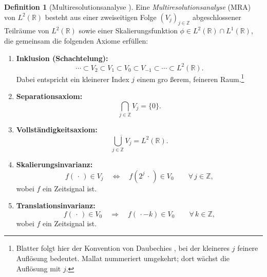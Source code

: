 \documentclass[a4paper,11pt,bibliography=totoc,listof=totoc,headinclude=true,cleardoublepage=empty,oneside]{scrbook}
\theoremstyle{definition}
\newtheorem{definition}[theorem]{Definition}
\theoremstyle{remark}
\begin{document}
   \begin{definition}[Multiresolutionsanalyse {\cite[S.\,106]{blatterWaveletsEinfuhrung2003}}]
   \label{def:mra}
   Eine \emph{Multiresolutionsanalyse} (MRA) von $L^2(\mathbb{R})$ besteht
   aus einer zweiseitigen Folge $(V_j)_{j \in \mathbb{Z}}$ abgeschlossener
   Teilräume von $L^2(\mathbb{R})$ sowie einer Skalierungsfunktion $\phi \in L^2(\mathbb{R}) \cap L^1(\mathbb{R})$,
   die gemeinsam die folgenden Axiome erfüllen:
   
   \begin{enumerate}
     \item \textbf{Inklusion (Schachtelung):}
       \begin{equation}
         \label{eq:mra-inklusion}
         \cdots \subset V_2 \subset V_1 \subset V_0 \subset V_{-1}
                \subset \cdots \subset L^2(\mathbb{R}).
       \end{equation}
       Dabei entspricht ein kleinerer Index $j$ einem gro \ss erem, feineren Raum.\footnote{%
         Blatter \cite[S.\,106]{blatterWaveletsEinfuhrung2003}
         folgt hier der Konvention von Daubechies \cite{daubechiesTenLecturesWavelets2006},
         bei der kleineres $j$ feinere Auflösung bedeutet.
         Mallat \cite{mallatWaveletTourSignal1999} nummeriert umgekehrt;
         dort wächst die Auflösung mit $j$.}
   
     \item \textbf{Separationsaxiom:}
       \begin{equation}
         \label{eq:mra-sep}
         \bigcap_{j \in \mathbb{Z}} V_j = \{0\}.
       \end{equation}
   
     \item \textbf{Vollständigkeitsaxiom:}
       \begin{equation}
         \label{eq:mra-voll}
         \overline{\bigcup_{j \in \mathbb{Z}} V_j} = L^2(\mathbb{R}).
       \end{equation}
   
     \item \textbf{Skalierungsinvarianz:}
       \begin{equation}
         \label{eq:mra-skala}
         f(\,\cdot\,) \in V_j
         \quad\Longleftrightarrow\quad
         f(2^j \,\cdot\,) \in V_0
         \qquad \forall\, j \in \mathbb{Z},
       \end{equation}
       wobei $f$ ein Zeitsignal ist.
   
     \item \textbf{Translationsinvarianz:}
       \begin{equation}
         \label{eq:mra-trans}
         f(\,\cdot\,) \in V_0
         \quad\Longrightarrow\quad
         f(\,\cdot - k) \in V_0
         \qquad \forall\, k \in \mathbb{Z},
       \end{equation}
       wobei $f$ ein Zeitsignal ist.
   

\end{enumerate}
\end{definition}
\end{document}
